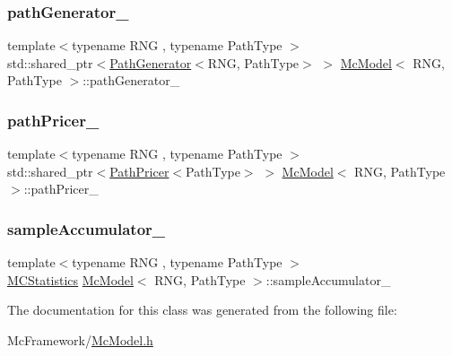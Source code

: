 \subsubsection{\texorpdfstring{path\+Generator\+\_\+}{pathGenerator\_}}
{\footnotesize\ttfamily template$<$typename R\+NG , typename Path\+Type $>$ \\
std\+::shared\+\_\+ptr$<$\hyperlink{class_path_generator}{Path\+Generator}$<$R\+NG, Path\+Type$>$ $>$ \hyperlink{class_mc_model}{Mc\+Model}$<$ R\+NG, Path\+Type $>$\+::path\+Generator\+\_\+\hspace{0.3cm}{\ttfamily [private]}}

\hypertarget{class_mc_model_aa05affe30ae38a403977d3b708d46608}{}\label{class_mc_model_aa05affe30ae38a403977d3b708d46608} 
\subsubsection{\texorpdfstring{path\+Pricer\+\_\+}{pathPricer\_}}
{\footnotesize\ttfamily template$<$typename R\+NG , typename Path\+Type $>$ \\
std\+::shared\+\_\+ptr$<$\hyperlink{class_path_pricer}{Path\+Pricer}$<$Path\+Type$>$ $>$ \hyperlink{class_mc_model}{Mc\+Model}$<$ R\+NG, Path\+Type $>$\+::path\+Pricer\+\_\+\hspace{0.3cm}{\ttfamily [private]}}

\hypertarget{class_mc_model_a3ec600743d8341a4cd46b5005a0f70ff}{}\label{class_mc_model_a3ec600743d8341a4cd46b5005a0f70ff} 
\subsubsection{\texorpdfstring{sample\+Accumulator\+\_\+}{sampleAccumulator\_}}
{\footnotesize\ttfamily template$<$typename R\+NG , typename Path\+Type $>$ \\
\hyperlink{class_m_c_statistics}{M\+C\+Statistics} \hyperlink{class_mc_model}{Mc\+Model}$<$ R\+NG, Path\+Type $>$\+::sample\+Accumulator\+\_\+\hspace{0.3cm}{\ttfamily [private]}}



The documentation for this class was generated from the following file\+:\begin{DoxyCompactItemize}
\item 
Mc\+Framework/\hyperlink{_mc_model_8h}{Mc\+Model.\+h}\end{DoxyCompactItemize}
